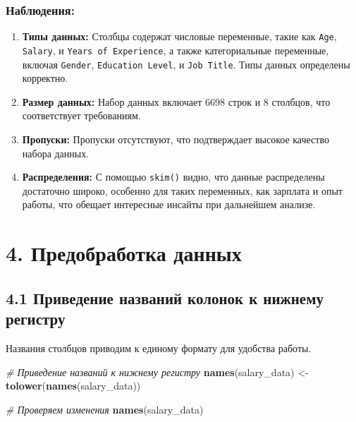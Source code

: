 \documentclass[
]{article}
\newenvironment{Shaded}{\begin{snugshade}}{\end{snugshade}}
\newcommand{\CommentTok}[1]{\textcolor[rgb]{0.56,0.35,0.01}{\textit{#1}}}
\newcommand{\FunctionTok}[1]{\textcolor[rgb]{0.13,0.29,0.53}{\textbf{#1}}}
\newcommand{\NormalTok}[1]{#1}
\newcommand{\OtherTok}[1]{\textcolor[rgb]{0.56,0.35,0.01}{#1}}
\providecommand{\tightlist}{%
  \setlength{\itemsep}{0pt}\setlength{\parskip}{0pt}}
\begin{document}
\subsubsection{Наблюдения:}\label{ux43dux430ux431ux43bux44eux434ux435ux43dux438ux44f-1}

\begin{enumerate}
\def\labelenumi{\arabic{enumi}.}
\tightlist
\item
  \textbf{Типы данных:} Столбцы содержат числовые переменные, такие как
  \texttt{Age}, \texttt{Salary}, и \texttt{Years\ of\ Experience}, а
  также категориальные переменные, включая \texttt{Gender},
  \texttt{Education\ Level}, и \texttt{Job\ Title}. Типы данных
  определены корректно.
\item
  \textbf{Размер данных:} Набор данных включает 6698 строк и 8 столбцов,
  что соответствует требованиям.
\item
  \textbf{Пропуски:} Пропуски отсутствуют, что подтверждает высокое
  качество набора данных.
\item
  \textbf{Распределения:} С помощью \texttt{skim()} видно, что данные
  распределены достаточно широко, особенно для таких переменных, как
  зарплата и опыт работы, что обещает интересные инсайты при дальнейшем
  анализе.
\end{enumerate}

\section{4. Предобработка
данных}\label{ux43fux440ux435ux434ux43eux431ux440ux430ux431ux43eux442ux43aux430-ux434ux430ux43dux43dux44bux445}

\subsection{4.1 Приведение названий колонок к нижнему
регистру}\label{ux43fux440ux438ux432ux435ux434ux435ux43dux438ux435-ux43dux430ux437ux432ux430ux43dux438ux439-ux43aux43eux43bux43eux43dux43eux43a-ux43a-ux43dux438ux436ux43dux435ux43cux443-ux440ux435ux433ux438ux441ux442ux440ux443}

Названия столбцов приводим к единому формату для удобства работы.

\begin{Shaded}
\begin{Highlighting}[]
\CommentTok{\# Приведение названий к нижнему регистру}
\FunctionTok{names}\NormalTok{(salary\_data) }\OtherTok{\textless{}{-}} \FunctionTok{tolower}\NormalTok{(}\FunctionTok{names}\NormalTok{(salary\_data))}

\CommentTok{\# Проверяем изменения}
\FunctionTok{names}\NormalTok{(salary\_data)}
\end{Highlighting}
\end{Shaded}
\end{document}
